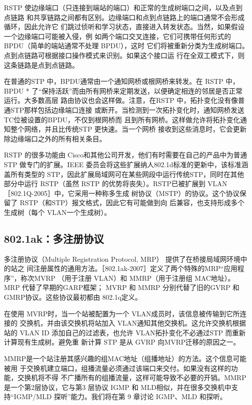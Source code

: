 RSTP 使边缘端口（只连接到端站的端口）和正常的生成树端口之间，以及点到点链路
和共享链路之间都有区别。边缘端口和点到点链路上的端口通常不会形成循环，因此允许它
们跳过侦听和学习状态，直接进入转发状态。当然，如果假设一个边缘端口可能被入侵，例
如两个端口交叉连接，它们可携带任何形式的BPDU（简单的端站通常不处理 BPDU），这时
它们将被重新分类为生成树端口。点到点链路可根据接口操作模式来识别。如果这个接口运
行在全双工模式下，则这条链路是点到点链路。

在普通的STP 中，BPDU通常由一个通知网桥或根网桥来转发。在 RSTP 中，BPDU *
了“保持活跃”而由所有网桥来定期发送，以便确定相连的邻居是否正常运行。大多数高层
路由协议也会这样做。注意，在RSTP 中，拓扑变化没有像普通STP那样包括边缘端口连接
或断开。当检测到一次拓扑变化时，通知网桥发送TC位被设置的BPDU，不仅到根网桥而
且到所有网桥。这样做允许将拓扑变化通知整个网络，并且比传统STP 更快速。当一个网桥
接收到这些消息时，它会更新除边缘端口之外的所有相关条目。

RSTP 的很多功能由 Cisco和其他公司开发，他们有时需要在自己的产品中为普通STP
做专门的扩展。IEEE 委员会将这些扩展纳人802.1d标准的更新中，该标准涵盖所有类型的
STP，因此扩展局域网可在某些网段中运行传统STP，同时在其他部分中运行 RSTP（虽然
RSTP 的优势将丧失）。RSTP已被扩展到 VLAN［802.1Q-2005］中，它采用一种称多生成
树协议（MSTP）的协议。这个协议保留了 RSTP（和STP）报文格式，因此它有可能做到向
后兼容，也支持形成多个生成树（每个 VLAN一个生成树）。

\subsection{802.1ak：多注册协议}

多注册协议（Multiple Registration Protocol, MRP） 提供了在桥接局域网环境中的站之
间注册属性的通用方法。［802.1ak-2007］定义了两个特殊的MRP“应用程序”，称次MVRP
（用于注册 VLAN）和 MMRP（用于注册组 MAC地址）。MRP 代替了早期的GARP框架；
MVRP 和 MMRP 分别代替了旧的GVRP 和GMRP协议。这些协议最初都由 802.1q定义。

在使用 MVRP时，当一个站被配置为一个 VLAN成员时，该信息被传输到它所连接的
交换机，并由该交换机将站加入 VLAN通知其他交换机。这允许交换机根据站的 VLAN ID
添加自己的过滤表，也允许 VLAN拓扑变化不必通过STP 而重新计算现有生成树。避免重
新计算 STP 是从 GVRP 向MVRP迁移的原因之一。

MMRP是一个站注册其感兴趣的组MAC地址（组播地址）的方法。这个信息可能被用
于交换机建立端口，组播流量必须通过该端口来交付。如果没有这样的功能，交换机将不得
不广播所有的组播流量，这样可能导致不必要的开销。MMRP是一个第2层协议，它与第3
层协议 IGMP 和 MLD相似，并在很多交换机中支持“IGMP/MLD 探听”能力。我们将在第
9 章讨论 IGMP、MLD 和探听。

